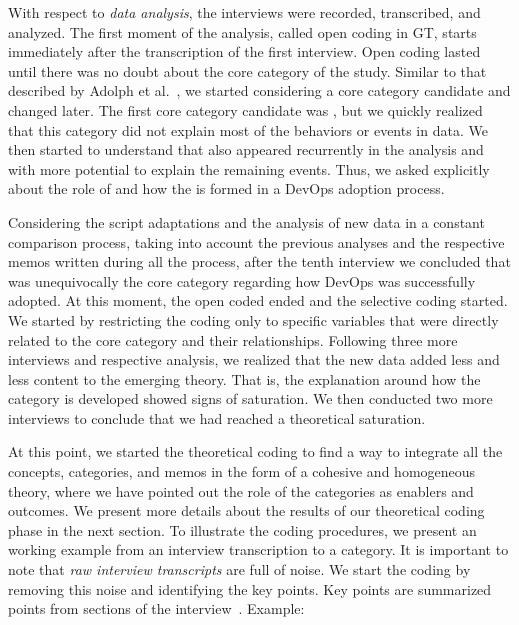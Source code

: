 With respect to \emph{data analysis}, the interviews were
recorded, transcribed, and analyzed. The first moment
of the analysis, called open coding in GT, starts immediately after the
transcription of the first interview.
Open coding lasted until there was no
doubt about the core category of the study. Similar to that described by
Adolph et al.~\cite{reconciling_perspectives}, we started
considering a core category candidate and changed later. The first core category
candidate was , but we quickly realized that this category did not
explain most of the behaviors
or events in data. We then started to understand that
\cc also appeared recurrently in the analysis and with more
potential to explain the remaining events. Thus, we asked explicitly
about the role of  and how the \cc is formed
in a DevOps adoption process.

Considering the script adaptations and the analysis of new data in a constant
comparison process, taking into account the previous analyses and the
respective memos written during all the process, after the tenth
interview we concluded that \cc was unequivocally the core
category regarding how DevOps was successfully adopted.
At this moment, the open coded ended and the selective coding started.
We started by restricting the coding only
to specific variables that were directly related to the core category and their
relationships. Following three more interviews and respective analysis, we realized that
the new data added less and less content to the emerging theory. That is, the
explanation around how the \cc category is developed showed signs of saturation.
We then conducted two more interviews to conclude that we had reached a
theoretical saturation.

At this point, we started the theoretical coding to find a way to integrate
all the concepts, categories, and memos in the form of a cohesive and
homogeneous theory, where we have pointed out the role of the categories as
enablers and outcomes. We present more details about
the results of our theoretical coding phase in the next section.
To illustrate the coding procedures, we present an working example from an
interview transcription to a category.
It is important to note that \emph{raw interview transcripts} are full of noise.
We start the coding by removing this noise and identifying the key points.
Key points are summarized points from sections of the interview~\cite{georgieva2008best}. Example:

